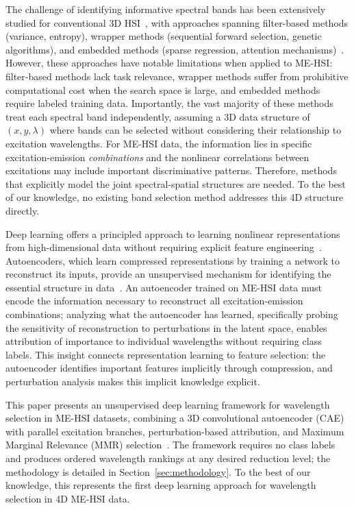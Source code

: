 The challenge of identifying informative spectral bands has been extensively studied for conventional 3D HSI~\cite{sun2019hyperspectral,jia2020survey}, with approaches spanning filter-based methods (variance, entropy), wrapper methods (sequential forward selection, genetic algorithms), and embedded methods (sparse regression, attention mechanisms)~\cite{martinez2006comparison,chang2000constrained,pudil1994floating,pal2010feature,tibshirani1996regression,mou2017deep}.
However, these approaches have notable limitations when applied to ME-HSI: filter-based methods lack task relevance, wrapper methods suffer from prohibitive computational cost when the search space is large, and embedded methods require labeled training data.
Importantly, the vast majority of these methods treat each spectral band independently, assuming a 3D data structure of $(x, y, \lambda)$ where bands can be selected without considering their relationship to excitation wavelengths.
For ME-HSI data, the information lies in specific excitation-emission \emph{combinations} and the nonlinear correlations between excitations may include important discriminative patterns.
Therefore, methods that explicitly model the joint spectral-spatial structures are needed.
To the best of our knowledge, no existing band selection method addresses this 4D structure directly.

Deep learning offers a principled approach to learning nonlinear representations from high-dimensional data without requiring explicit feature engineering~\cite{lecun2015deep}.
Autoencoders, which learn compressed representations by training a network to reconstruct its inputs, provide an unsupervised mechanism for identifying the essential structure in data~\cite{hinton2006reducing,bengio2013representation}.
An autoencoder trained on ME-HSI data must encode the information necessary to reconstruct all excitation-emission combinations; analyzing what the autoencoder has learned, specifically probing the sensitivity of reconstruction to perturbations in the latent space, enables attribution of importance to individual wavelengths without requiring class labels.
This insight connects representation learning to feature selection: the autoencoder identifies important features implicitly through compression, and perturbation analysis makes this implicit knowledge explicit.

This paper presents an unsupervised deep learning framework for wavelength selection in ME-HSI datasets, combining a 3D convolutional autoencoder (CAE) with parallel excitation branches, perturbation-based attribution, and Maximum Marginal Relevance (MMR) selection~\cite{carbonell1998use}.
The framework requires no class labels and produces ordered wavelength rankings at any desired reduction level; the methodology is detailed in Section~\ref{sec:methodology}.
To the best of our knowledge, this represents the first deep learning approach for wavelength selection in 4D ME-HSI data.

